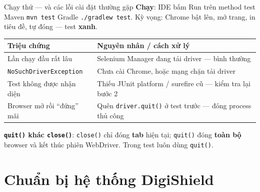 \documentclass[aspectratio=169,12pt]{beamer}
\begin{document}
\begin{frame}{Chạy thử --- và các lỗi cài đặt thường gặp}
  {\small \textbf{Chạy}: IDE bấm Run trên method test \textbullet{}
  Maven \texttt{mvn test} \textbullet{} Gradle \texttt{./gradlew test}.
  Kỳ vọng: Chrome bật lên, mở trang, in tiêu đề, tự đóng --- test
  \textbf{xanh}.}

  \vspace{0.1em}

  \begin{center}
  \footnotesize
  \setlength{\tabcolsep}{4pt}
  \begin{tabular}{>{\raggedright\arraybackslash}p{5.9cm}>{\raggedright\arraybackslash}p{6.3cm}}
    \toprule
    \textbf{Triệu chứng} & \textbf{Nguyên nhân / cách xử lý} \\
    \midrule
    Lần chạy đầu rất lâu & Selenium Manager đang tải driver --- bình thường \\
    \texttt{NoSuchDriverException} & Chưa cài Chrome, hoặc mạng chặn tải driver \\
    Test không được nhận diện & Thiếu JUnit platform / surefire cũ --- kiểm tra lại bước 2 \\
    Browser mở rồi ``đứng'' mãi & Quên \texttt{driver.quit()} ở test trước --- đóng process thủ công \\
    \bottomrule
  \end{tabular}
  \end{center}

  {\small \textbf{\texttt{quit()} khác \texttt{close()}}: \texttt{close()} chỉ
  đóng \textbf{tab} hiện tại; \texttt{quit()} đóng \textbf{toàn bộ} browser và
  kết thúc phiên WebDriver. Trong test luôn dùng \texttt{quit()}.}
\end{frame}

\section{Chuẩn bị hệ thống DigiShield}
\end{document}
